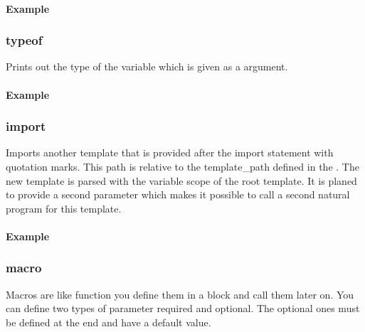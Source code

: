 \documentclass[letterpaper,10pt,english]{sphinxmanual}
\begin{document}
\paragraph{Example}
\label{html-parser:id2}


\subsubsection{typeof}
\label{html-parser:typeof}
Prints out the type of the variable which is given as a argument.


\paragraph{Example}
\label{html-parser:id3}


\subsubsection{import}
\label{html-parser:import}
Imports another template that is provided after the import statement with quotation marks. This path is relative to the template\_path defined in the {\hyperref[webserver:webserver\string-config]{}}. The new template is parsed with the variable scope of the root template. It is planed to provide a second parameter which makes it possible to call a second natural program for this template.


\paragraph{Example}
\label{html-parser:id4}


\subsubsection{macro}
\label{html-parser:macro}
Macros are like function you define them in a block and call them later on. You can define two types of parameter required and optional. The optional ones must be defined at the end and have a default value.
\end{document}
